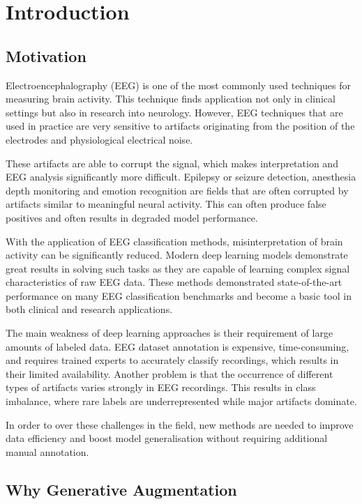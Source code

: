 \chapter{Introduction}

\section{Motivation}

Electroencephalography (EEG) is one of the most commonly used techniques for measuring brain activity. This technique finds application not only in clinical settings but also in research into neurology. However, EEG techniques that are used in practice are very sensitive to artifacts originating from the position of the electrodes and physiological electrical noise. 

These artifacts are able to corrupt the signal, which makes interpretation and EEG analysis significantly more difficult. Epilepsy or seizure detection, anesthesia depth monitoring and emotion recognition are fields that are often corrupted by artifacts similar to meaningful neural activity. This can often produce false positives and often results in degraded model performance.

With the application of EEG classification methods, misinterpretation of brain activity can be significantly reduced. Modern deep learning models demonstrate great results in solving such tasks as they are capable of learning complex signal characteristics of raw EEG data. These methods demonstrated state-of-the-art performance on many EEG classification benchmarks and become a basic tool in both clinical and research applications.

The main weakness of deep learning approaches is their requirement of large amounts of labeled data. EEG dataset annotation is expensive, time-consuming, and requires trained experts to accurately classify recordings, which results in their limited availability. Another problem is that the occurrence of different types of artifacts varies strongly in EEG recordings. This results in class imbalance, where rare labels are underrepresented while major artifacts dominate.

In order to over these challenges in the field, new methods are needed to improve data efficiency and boost model generalisation without requiring additional manual annotation.

\section{Why Generative Augmentation}

